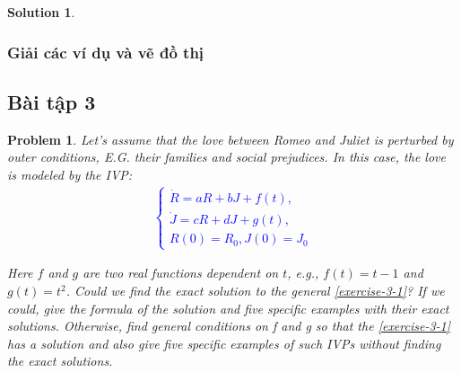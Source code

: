 \documentclass[a4paper]{article}
\newtheorem*{problem}{Problem}
\newtheorem*{sol}{Solution}
\begin{document}
\begin{sol}
\subsubsection{Giải các ví dụ và vẽ đồ thị}

\end{sol}
\pagebreak

\subsection{Bài tập 3}
\begin{problem}
   Let’s assume that the love between Romeo and Juliet is perturbed by outer
conditions, E.G. their families and social prejudices. In this case, the love is modeled by the IVP:
\textcolor{blue}{
\begin{align}\label{exercise-3-1}
    \begin{cases}
    \dot{R}=aR+bJ+f(t),\\
    \dot{J}=cR+dJ+g(t),\\
    R(0)=R_0,J(0)=J_0
    \end{cases}\tag{13}
\end{align}
}

Here $f$ and $g$ are two real functions dependent on $t$, e.g., $f(t) = t - 1$ and $g(t) = t^2$. Could we find the exact solution to the general \eqref{exercise-3-1}? If we could, give the formula of the solution and five
specific examples with their exact solutions. Otherwise, find general conditions on f and g so that the
\eqref{exercise-3-1} has a solution and also give five specific examples of such IVPs without finding the
exact solutions.  
\end{problem}
\end{document}

